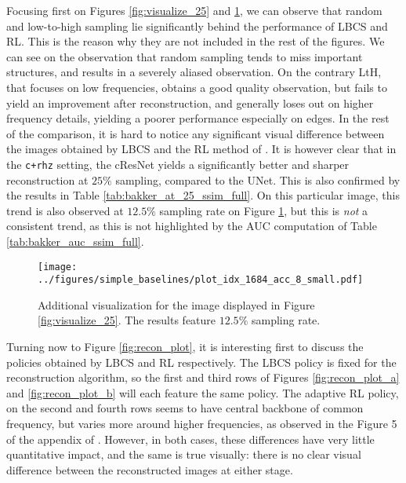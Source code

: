 Focusing first on Figures \ref{fig:visualize_25} and \ref{fig:visualize_12}, we can observe that random and low-to-high sampling lie significantly behind the performance of LBCS and RL. This is the reason why they are not included in the rest of the figures. We can see on the observation that random sampling tends to miss important structures, and results in a severely aliased observation. On the contrary LtH, that focuses on low frequencies, obtains a good quality observation, but fails to yield an improvement after reconstruction, and generally loses out on higher frequency details, yielding a poorer performance especially on edges. In the rest of the comparison, it is hard to notice any significant visual difference between the images obtained by LBCS and the RL method of \citet{bakker2020experimental}. It is however clear that in the \texttt{c+rhz} setting, the cResNet yields a significantly better and sharper reconstruction at $25\%$ sampling, compared to the UNet. This is also confirmed by the results in Table \ref{tab:bakker_at_25_ssim_full}. On this particular image, this trend is also observed at $12.5\%$ sampling rate on Figure \ref{fig:visualize_12}, but this is \textit{not} a consistent trend, as this is not highlighted by the AUC computation of Table \ref{tab:bakker_auc_ssim_full}.



\begin{figure}[ht]
    \centering
    \texttt{[image: ../figures/simple\_baselines/plot\_idx\_1684\_acc\_8\_small.pdf]}
    \caption{Additional visualization for the image displayed in Figure \ref{fig:visualize_25}. The results feature $12.5\%$ sampling rate.}
    \label{fig:visualize_12}
    \vspace{-.4cm}
\end{figure}

Turning now to Figure \ref{fig:recon_plot}, it is interesting first to discuss the policies obtained by LBCS and RL respectively. The LBCS policy is fixed for the reconstruction algorithm, so the first and third rows of Figures \ref{fig:recon_plot_a} and \ref{fig:recon_plot_b} will each feature the same policy. The adaptive RL policy, on the second and fourth rows seems to have central backbone of common frequency, but varies more around higher frequencies, as observed in the Figure 5 of the appendix of \citet{bakker2020experimental}. However, in both cases, these differences have very little quantitative impact, and the same is true visually: there is no clear visual difference between the reconstructed images at either stage.

